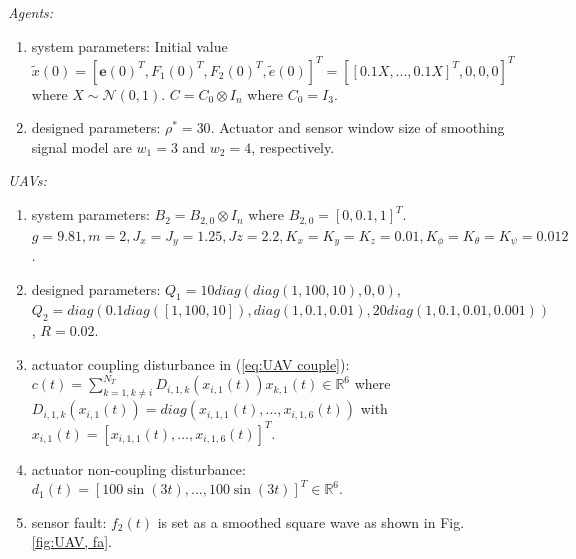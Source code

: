 \documentclass{ieeeaccess}
\begin{document}
\textit{Agents:}\begin{enumerate}
    \item system parameters:
    Initial value $\tilde{x}(0) = [\pmb{e}(0)^T, F_1(0)^T\mathbin{,} F_2(0)^T, \tilde{e}(0)]^T = [[0.1X, ..., 0.1X]^T, 0, 0, 0]^T$ where $X \sim \mathcal{N}(0, 1)$. $C = C_0 \otimes I_n$ where $C_0 = I_3$.
    \item designed parameters: $\rho^*=30$. Actuator and sensor window size of smoothing signal model are $w_1=3$ and $w_2=4$, respectively.
\end{enumerate}

\textit{UAVs:}\begin{enumerate}
    \item system parameters:
    $B_2=B_{2,0}\otimes I_n$ where $B_{2,0} = [0, 0.1, 1]^T$.
    $g = 9.81, m = 2,
    J_x = J_y = 1.25, Jz = 2.2,
    K_x = K_y = K_z = 0.01,
    K_\phi = K_\theta = K_\psi = 0.012$.

    \item designed parameters: 
    $Q_1 = 10diag(diag(1,100,10)\mathbin{,} 0\mathbin{,} 0)$, 
    $Q_2 = diag(0.1diag([1\mathbin{,} 100\mathbin{,} 10]), diag(1,0.1\mathbin{,} 0.01), 20diag(1,0.1,0.01 ,0.001))$, 
    $R = 0.02$.

    \item actuator coupling disturbance in (\ref{eq:UAV couple}):
    \\$c(t) = \sum_{k = 1, k \neq i}^{N_T}D_{i, 1, k}(x_{i, 1}(t))x_{k, 1}(t)\in\mathbb{R}^6$ where $D_{i, 1, k}(x_{i, 1}(t)) = diag(x_{i, 1, 1}(t)\mathbin{,}\dots\mathbin{,}x_{i, 1, 6}(t))$ with $x_{i, 1}(t) = [x_{i, 1, 1}(t)\mathbin{,}\dots\mathbin{,}x_{i, 1, 6}(t)]^T$.
    \item actuator non-coupling disturbance:
    \\ $d_1(t) = [100\sin(3t)\mathbin{,} ...\mathbin{,} 100\sin(3t)]^T\in\mathbb{R}^6$.
    \item sensor fault: $f_2(t)$ is set as a smoothed square wave as shown in Fig. \ref{fig:UAV, fa}.
\end{enumerate}
\end{document}
